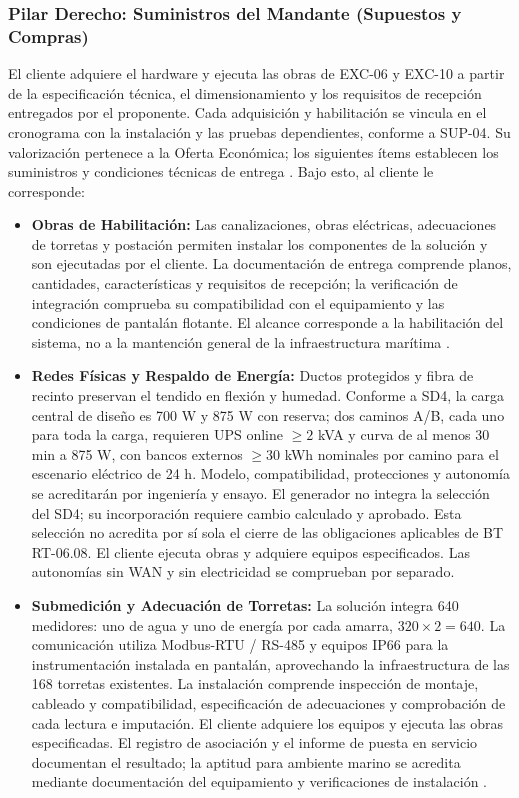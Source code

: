 \subsubsection{Pilar Derecho: Suministros del Mandante (Supuestos y Compras)}
El cliente adquiere el hardware y ejecuta las obras de EXC-06 y EXC-10 a partir de la especificación técnica, el dimensionamiento y los requisitos de recepción entregados por el proponente. Cada adquisición y habilitación se vincula en el cronograma con la instalación y las pruebas dependientes, conforme a SUP-04. Su valorización pertenece a la Oferta Económica; los siguientes ítems establecen los suministros y condiciones técnicas de entrega \parencite[cap.~11]{caso07}.
Bajo esto, al cliente le corresponde:
\begin{itemize}
    \item \textbf{Obras de Habilitación:} Las canalizaciones, obras eléctricas, adecuaciones de torretas y postación permiten instalar los componentes de la solución y son ejecutadas por el cliente. La documentación de entrega comprende planos, cantidades, características y requisitos de recepción; la verificación de integración comprueba su compatibilidad con el equipamiento y las condiciones de pantalán flotante. El alcance corresponde a la habilitación del sistema, no a la mantención general de la infraestructura marítima \parencite[caps.~10--11]{caso07}.
    \item \textbf{Redes Físicas y Respaldo de Energía:} Ductos protegidos y fibra de recinto preservan el tendido en flexión y humedad. Conforme a SD4, la carga central de diseño es 700 W y 875 W con reserva; dos caminos A/B, cada uno para toda la carga, requieren UPS online $\ge2$ kVA y curva de al menos 30 min a 875 W, con bancos externos $\ge30$ kWh nominales por camino para el escenario eléctrico de 24 h. Modelo, compatibilidad, protecciones y autonomía se acreditarán por ingeniería y ensayo. El generador no integra la selección del SD4; su incorporación requiere cambio calculado y aprobado. Esta selección no acredita por sí sola el cierre de las obligaciones aplicables de BT RT-06.08. El cliente ejecuta obras y adquiere equipos especificados. Las autonomías sin WAN y sin electricidad se comprueban por separado.
    \item \textbf{Submedición y Adecuación de Torretas:} La solución integra 640 medidores: uno de agua y uno de energía por cada amarra, $320 \times 2 = 640$. La comunicación utiliza Modbus-RTU / RS-485 y equipos IP66 para la instrumentación instalada en pantalán, aprovechando la infraestructura de las 168 torretas existentes. La instalación comprende inspección de montaje, cableado y compatibilidad, especificación de adecuaciones y comprobación de cada lectura e imputación. El cliente adquiere los equipos y ejecuta las obras especificadas. El registro de asociación y el informe de puesta en servicio documentan el resultado; la aptitud para ambiente marino se acredita mediante documentación del equipamiento y verificaciones de instalación \parencite[sec.~2.3; caps.~10--11; sec.~14.1]{caso07}.

\end{itemize}
